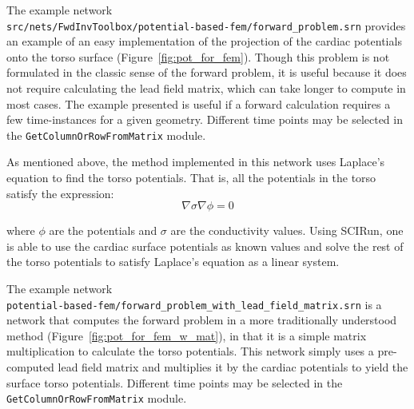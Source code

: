 \documentclass[fleqn,11pt,openany]{book}
\begin{document}
The example network\\
{\tt src/nets/FwdInvToolbox/potential-based-fem/forward\_problem.srn} provides an example of an easy implementation of the projection of the cardiac potentials onto the torso surface (Figure~\ref{fig:pot_for_fem}). Though this problem is not formulated in the classic sense of the forward problem, it is useful because it does not require calculating the lead field matrix, which can take longer to compute in most cases. The example presented is useful if a forward calculation requires a few time-instances for a given geometry. Different time points may be selected in the {\tt GetColumnOrRowFromMatrix} module.

As mentioned above, the method implemented in this network uses Laplace's equation to find the torso potentials. That is, all the potentials in the torso satisfy the expression:
\begin{equation*}
\nabla \sigma \nabla \phi = 0
\end{equation*}

\noindent where $\phi$ are the potentials and $\sigma$ are the conductivity values. Using SCIRun, one is able to use the cardiac surface potentials as known values and solve the rest of the torso potentials to satisfy Laplace's equation as a linear system.

The example network\\
{\tt potential-based-fem/forward\_problem\_with\_lead\_field\_matrix.srn} is a network that computes the forward problem in a more traditionally understood method (Figure~\ref{fig:pot_for_fem_w_mat}), in that it is a simple matrix multiplication to calculate the torso potentials. This network simply uses a pre-computed lead field matrix and multiplies it by the cardiac potentials to yield the surface torso potentials. Different time points may be selected in the {\tt GetColumnOrRowFromMatrix} module.
\end{document}
